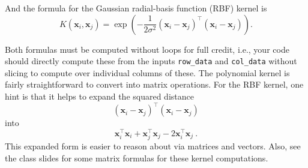 \documentclass[10pt]{article}
\newcommand{\bx}{{\boldsymbol x}}
\begin{document}
\begin{enumerate}
And the formula for the Gaussian radial-basis function (RBF) kernel is
\begin{equation}
K(\bx_i, \bx_j) = \exp\left(- \frac{1}{2 \sigma^2} (\bx_i - \bx_j) ^\top (\bx_i - \bx_j)\right).
\end{equation}

Both formulas must be computed without loops for full credit, i.e., your code should directly compute these from the inputs \texttt{row\_data} and \texttt{col\_data} without slicing to compute over individual columns of these. The polynomial kernel is fairly straightforward to convert into matrix operations. For the RBF kernel, one hint is that it helps to expand the squared distance 
\[
(\bx_i - \bx_j) ^\top (\bx_i - \bx_j)
\]
into
\[
\bx_i^\top \bx_i + \bx_j^\top \bx_j - 2 \bx_i^\top \bx_j~.
\]
This expanded form is easier to reason about via matrices and vectors. Also, see the class slides for some matrix formulas for these kernel computations.

\end{enumerate}
\end{document}
